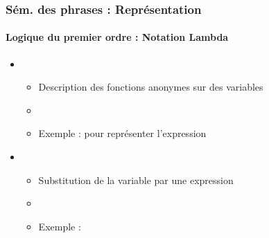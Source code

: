 \documentclass[xcolor=table]{beamer}
\begin{document}
\begin{frame}
	\frametitle{Sém. des phrases : Représentation}
	\framesubtitle{Logique du premier ordre : Notation Lambda}
	
	\begin{itemize}
		\item {}
		\begin{itemize}
			\item Description des fonctions anonymes sur des variables
			\item {}
			\item Exemple :  pour représenter l'expression 
		\end{itemize}
	
		\item {}
		\begin{itemize}
			\item Substitution de la variable par une expression
			\item \keyword{$ \phi (\psi) $}
			\item Exemple : 
		\end{itemize}
	\end{itemize}
	
\end{frame}
\end{document}
